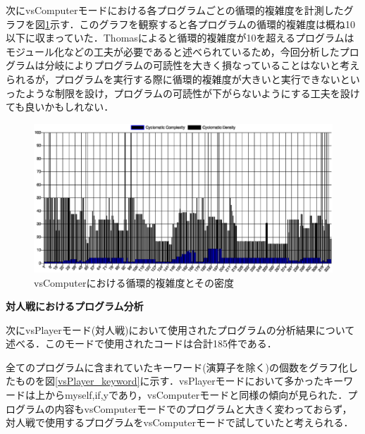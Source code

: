 次にvsComputerモードにおける各プログラムごとの循環的複雑度を計測したグラフを図\ref{vsComputer_cyclomatic_complexity}示す．このグラフを観察すると各プログラムの循環的複雑度は概ね10以下に収まっていた．Thomasによると循環的複雑度が10を超えるプログラムはモジュール化などの工夫が必要であると述べられているため，今回分析したプログラムは分岐によりプログラムの可読性を大きく損なっていることはないと考えられるが，プログラムを実行する際に循環的複雑度が大きいと実行できないといったような制限を設け，プログラムの可読性が下がらないようにする工夫を設けても良いかもしれない．

\begin{figure}[!ht]
  \begin{center}
    \includegraphics[width=1.0\linewidth]{image/vsComputer_escomplex_complexity.eps}
  \end{center}
    \vspace{-8mm} 
  \caption{vsComputerにおける循環的複雑度とその密度}
  \label{vsComputer_cyclomatic_complexity}
\end{figure}

\vspace{10truept}
\noindent
{\bf 対人戦におけるプログラム分析}

次にvsPlayerモード(対人戦)において使用されたプログラムの分析結果について述べる．このモードで使用されたコードは合計185件である．

全てのプログラムに含まれていたキーワード(演算子を除く)の個数をグラフ化したものを図\ref{vsPlayer_keyword}に示す．vsPlayerモードにおいて多かったキーワードは上からmyself,if,yであり，vsComputerモードと同様の傾向が見られた．プログラムの内容もvsComputerモードでのプログラムと大きく変わっておらず，対人戦で使用するプログラムをvsComputerモードで試していたと考えられる．

